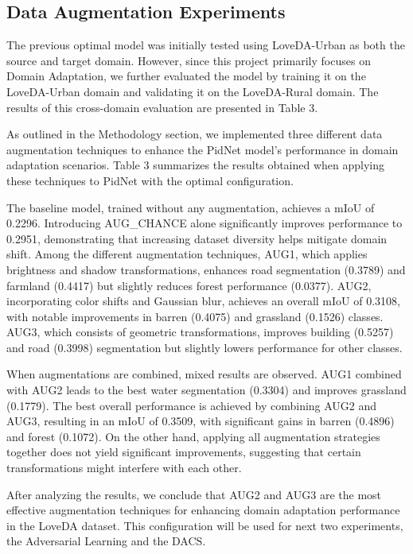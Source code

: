 \documentclass[10pt,twocolumn,letterpaper]{article}
\begin{document}
\subsection{Data Augmentation Experiments}

The previous optimal model was initially tested using LoveDA-Urban as both the source and target domain. However, since this project primarily focuses on Domain Adaptation, we further evaluated the model by training it on the LoveDA-Urban domain and validating it on the LoveDA-Rural domain. The results of this cross-domain evaluation are presented in Table 3.

As outlined in the Methodology section, we implemented three different data augmentation techniques to enhance the PidNet model’s performance in domain adaptation scenarios. Table 3 summarizes the results obtained when applying these techniques to PidNet with the optimal configuration.

The baseline model, trained without any augmentation, achieves a mIoU of 0.2296. Introducing AUG\_CHANCE alone significantly improves performance to 0.2951, demonstrating that increasing dataset diversity helps mitigate domain shift. Among the different augmentation techniques, AUG1, which applies brightness and shadow transformations, enhances road segmentation (0.3789) and farmland (0.4417) but slightly reduces forest performance (0.0377). AUG2, incorporating color shifts and Gaussian blur, achieves an overall mIoU of 0.3108, with notable improvements in barren (0.4075) and grassland (0.1526) classes. AUG3, which consists of geometric transformations, improves building (0.5257) and road (0.3998) segmentation but slightly lowers performance for other classes. 

When augmentations are combined, mixed results are observed. AUG1 combined with AUG2 leads to the best water segmentation (0.3304) and improves grassland (0.1779). The best overall performance is achieved by combining AUG2 and AUG3, resulting in an mIoU of 0.3509, with significant gains in barren (0.4896) and forest (0.1072). On the other hand, applying all augmentation strategies together does not yield significant improvements, suggesting that certain transformations might interfere with each other. 

After analyzing the results, we conclude that AUG2 and AUG3 are the most effective augmentation techniques for enhancing domain adaptation performance in the LoveDA dataset. This configuration will be used for next two experiments, the Adversarial Learning and the DACS.
\end{document}
